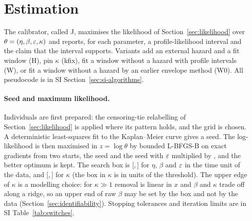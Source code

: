 \section{Estimation}\label{sec:estimation}

The calibrator, called J, maximises the likelihood of Section~\ref{sec:likelihood} over $\theta=(\eta,\beta,\varepsilon,\kappa)$ and
reports, for each parameter, a profile-likelihood interval and the claim that the interval supports. Variants add an
external hazard and a fit window (H), pin $\kappa$ (kfix), fit a window without a hazard with profile intervals (W), or fit a
window without a hazard by an earlier envelope method (W0). All pseudocode is in SI
Section~\ref{sec:si-algorithms}.

\paragraph{Seed and maximum likelihood.} Individuals are first prepared: the censoring-tie relabelling of
Section~\ref{sec:likelihood} is applied where its pattern holds, and the grid is chosen. A deterministic least-squares fit to
the Kaplan--Meier curve gives a seed. The log-likelihood is then maximised in $z=\log\theta$ by bounded L-BFGS-B
\citep{byrd1995limited,zhu1997algorithm} on exact gradients from two starts, the seed and the seed with $\varepsilon$ multiplied by
, and the better optimum is kept. The search box is [,\,] for $\eta$, $\beta$ and $\varepsilon$ in the time
unit of the data, and [,\,] for $\kappa$ (the box in $\kappa$ is in units of the threshold). The upper edge of
$\kappa$ is a modelling choice: for $\kappa\gg1$ removal is linear in $x$ and $\beta$ and $\kappa$ trade off along a ridge, so an
upper end of raw $\beta$ may be set by the box and not by the data (Section~\ref{sec:identifiability}). Stopping tolerances and
iteration limits are in SI Table~\ref{tab:switches}.

